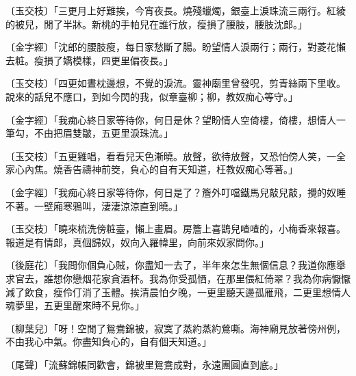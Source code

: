 \begin{showcontents}{}
〔玉交枝〕「三更月上好難挨，今宵夜長。燒殘蠟燭，銀臺上淚珠流三兩行。紅綾的被兒，閒了半牀。新桃的手帕兒在誰行放，瘦損了腰肢，腰肢沈郎。」

〔金字經〕「沈郎的腰肢瘦，每日家愁斷了腸。盼望情人淚兩行；兩行，對菱花懶去粧。瘦損了嬌模樣，四更里偏夜長。」

〔玉交枝〕「四更如晝枕邊想，不覺的淚流。靈神廟里曾發呪，剪青絲兩下里收。說來的話兒不應口，到如今閃的我，似章臺柳；柳，教奴痴心等守。」

〔金字經〕「我痴心終日家等待你，何日是休？望盼情人空倚樓，倚樓，想情人一筆勾，不由把眉雙皺，五更里淚珠流。」

〔玉交枝〕「五更雞唱，看看兒天色漸曉。放聲，欲待放聲，又恐怕傍人笑，一全家心內焦。燒香告禱神前筊，負心的自有天知道，枉教奴痴心等著。」

〔金字經〕「我痴心終日家等待你，何日是了？簷外叮噹鐵馬兒敲兒敲，攪的奴睡不著。一壁廂寒鴉叫，淒淒涼涼直到曉。」

〔玉交枝〕「曉來梳洗傍粧臺，懶上畫眉。房簷上喜鵲兒喳喳的，小梅香來報喜。報道是有情郎，真個歸奴，奴向入羅幃里，向前來奴家問你。」

〔後庭花〕「我問你個負心賊，你盡知一去了，半年來怎生無個信息？我道你應舉求官去，誰想你戀烟花家貪酒杯。我為你受孤恓，在那里偎紅倚翠？我為你病懨懨減了飲食，瘦伶仃消了玉體。挨清晨怕夕晚，一更里聽天邊孤雁飛，二更里想情人魂夢里，五更里醒來時不見你。」

〔柳葉兒〕「呀！空閒了鴛鴦錦被，寂寞了蒸約蒸約鶯嘶。海神廟見放著傍州例，不由我心中氣。你盡知負心的，自有個天知道。」

〔尾聲〕「流蘇錦帳同歡會，錦被里鴛鴦成對，永遠團圓直到底。」


\end{showcontents}
